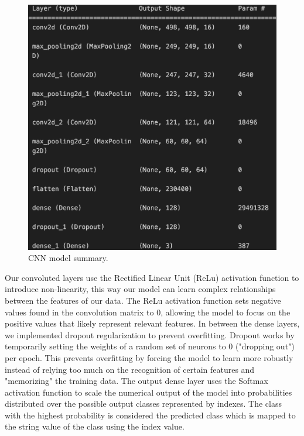 \begin{figure}[h]
	\centering
	\includegraphics[scale=0.5]{CNN_structure}
	\caption{CNN model summary.}
	\label{fig:figure3}
\end{figure}

Our convoluted layers use the Rectified Linear Unit (ReLu) activation function to introduce non-linearity, this way our model can learn complex relationships between the features of our data. 
The ReLu activation function sets negative values found in the convolution matrix to 0, allowing the model to focus on the positive values that likely represent relevant features. 
In between the dense layers, we implemented dropout regularization to prevent overfitting. 
Dropout works by temporarily setting the weights of a random set of neurons to 0 ("dropping out") per epoch. 
This prevents overfitting by forcing the model to learn more robustly instead of relying too much on the recognition of certain features and "memorizing" the training data. 
The output dense layer uses the Softmax activation function to scale the numerical output of the model into probabilities distributed over the possible output classes represented by indexes. 
The class with the highest probability is considered the predicted class which is mapped to the string value of the class using the index value.

